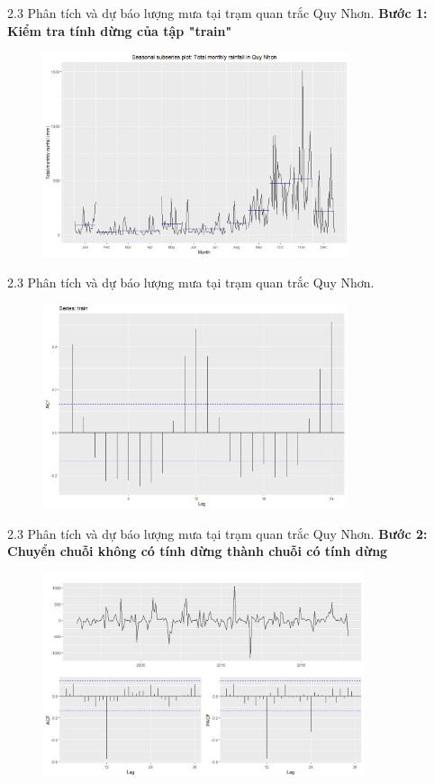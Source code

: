 \documentclass[notheorems,envcountsect,hyperref=unicode]{beamer}
\begin{document}
\begin{frame}{2.3 Phân tích và dự báo lượng mưa tại trạm quan trắc Quy Nhơn.}
\textbf{Bước 1: Kiểm tra tính dừng của tập "train"}
	\begin{figure}[!htb]
		\centering
		\includegraphics[width=1\linewidth,height=6cm]{V4} 
	\end{figure}
\end{frame}

\begin{frame}{2.3 Phân tích và dự báo lượng mưa tại trạm quan trắc Quy Nhơn.}
	\begin{figure}[!htb]
		\centering
		\includegraphics[width=1\linewidth,height=6cm]{acfrainfall} 
	\end{figure}
\end{frame}

\begin{frame}{2.3 Phân tích và dự báo lượng mưa tại trạm quan trắc Quy Nhơn.}
	\textbf{Bước 2: Chuyển chuỗi không có tính dừng thành chuỗi có tính dừng}
	\begin{figure}[!htb]
		\centering
		\includegraphics[width=1\linewidth,height=6cm]{V6} 
	\end{figure}
\end{frame}
\end{document}
